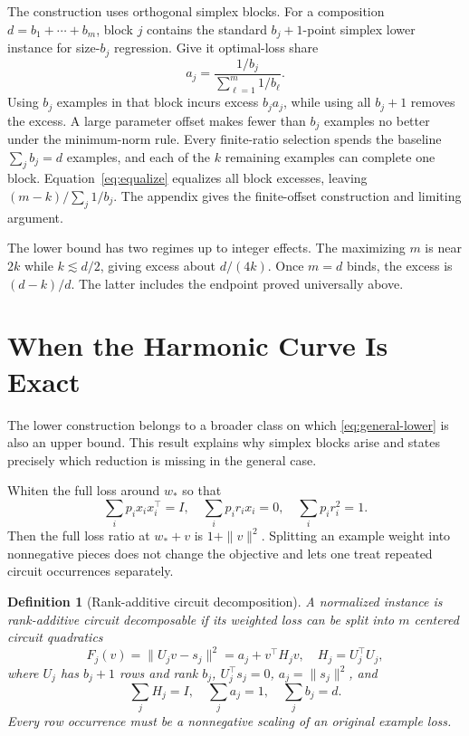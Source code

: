 \documentclass[twoside]{article}
\newtheorem{definition}[theorem]{Definition}
\begin{document}
The construction uses orthogonal simplex blocks. For a composition $d=b_1+\cdots+b_m$, block $j$ contains the standard $b_j+1$-point simplex lower instance for size-$b_j$ regression. Give it optimal-loss share
\begin{equation}
 a_j=\frac{1/b_j}{\sum_{\ell=1}^m1/b_\ell}.
 \label{eq:equalize}
\end{equation}
Using $b_j$ examples in that block incurs excess $b_ja_j$, while using all $b_j+1$ removes the excess. A large parameter offset makes fewer than $b_j$ examples no better under the minimum-norm rule. Every finite-ratio selection spends the baseline $\sum_jb_j=d$ examples, and each of the $k$ remaining examples can complete one block. Equation~\eqref{eq:equalize} equalizes all block excesses, leaving $(m-k)/\sum_j1/b_j$. The appendix gives the finite-offset construction and limiting argument.

The lower bound has two regimes up to integer effects. The maximizing $m$ is near $2k$ while $k\lesssim d/2$, giving excess about $d/(4k)$. Once $m=d$ binds, the excess is $(d-k)/d$. The latter includes the endpoint proved universally above.

\section{When the Harmonic Curve Is Exact}

The lower construction belongs to a broader class on which \eqref{eq:general-lower} is also an upper bound. This result explains why simplex blocks arise and states precisely which reduction is missing in the general case.

Whiten the full loss around $w_*$ so that
\begin{equation}
 \sum_i p_ix_ix_i^\top=I,\quad
 \sum_i p_ir_ix_i=0,\quad
 \sum_i p_ir_i^2=1.
 \label{eq:normal-form}
\end{equation}
Then the full loss ratio at $w_*+v$ is $1+\|v\|^2$. Splitting an example weight into nonnegative pieces does not change the objective and lets one treat repeated circuit occurrences separately.

\begin{definition}[Rank-additive circuit decomposition]
\label{def:circuits}
A normalized instance is rank-additive circuit decomposable if its weighted loss can be split into $m$ centered circuit quadratics
\begin{equation}
 F_j(v)=\|U_jv-s_j\|^2=a_j+v^\top H_jv,
 \quad H_j=U_j^\top U_j,
 \label{eq:circuit-quadratic}
\end{equation}
where $U_j$ has $b_j+1$ rows and rank $b_j$, $U_j^\top s_j=0$, $a_j=\|s_j\|^2$, and
\begin{equation}
 \sum_jH_j=I,\quad \sum_ja_j=1,\quad \sum_jb_j=d.
 \label{eq:rank-additive}
\end{equation}
Every row occurrence must be a nonnegative scaling of an original example loss.
\end{definition}
\end{document}
